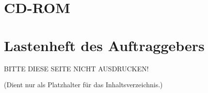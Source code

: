 \section{CD-ROM}\label{cd}

\newpage
\section{Lastenheft des Auftraggebers}

BITTE DIESE SEITE NICHT AUSDRUCKEN!

(Dient nur als Platzhalter für das Inhaltsverzeichnis.)